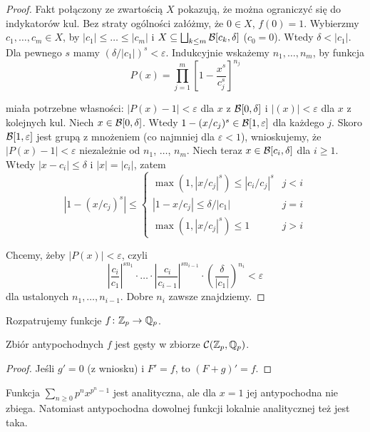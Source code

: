 \begin{proof}
	Fakt połączony ze zwartością $X$ pokazują, że można ograniczyć się do indykatorów kul.
	Bez straty ogólności załóżmy, że $0 \in X$, $f(0) = 1$.
	Wybierzmy $c_1, \ldots, c_m \in X$, by $|c_1| \le \ldots \le |c_m|$ i $X \subseteq \bigsqcup_{k \le m} \mathcal B[c_k, \delta]$ ($c_0 = 0$).
	Wtedy $\delta <|c_1|$.
	Dla pewnego $s$ mamy $(\delta / |c_1|)^s < \varepsilon$.
	Indukcyjnie wskażemy $n_1, \ldots, n_m$, by funkcja
	\[
		P(x) = \prod_{j=1}^m \left[1 - \frac{x^s}{c_j^s}\right]^{n_j}
	\]

	miała potrzebne własności: $|P(x) - 1| < \varepsilon$ dla $x$ z $\mathcal B[0, \delta]$ i $|(x)| < \varepsilon$ dla $x$ z kolejnych kul.
	Niech $x \in \mathcal B[0, \delta]$.
	Wtedy $1 - (x/c_j)^s \in \mathcal B[1, \varepsilon]$ dla każdego $j$.
	Skoro $\mathcal B[1, \varepsilon]$ jest grupą z mnożeniem (co najmniej dla $\varepsilon < 1$), wnioskujemy, że $|P(x) - 1| < \varepsilon$ niezależnie od $n_1$, $\ldots$, $n_m$.
	Niech teraz $x \in \mathcal B[c_i, \delta]$ dla $i \ge 1$.
	Wtedy $|x - c_i| \le \delta$ i $|x| = |c_i|$, zatem
	\[
		|1 - (x/c_j)^s| \le \begin{cases} \max(1, |x/c_j|^s) \le |c_i / c_j|^s & j < i \\
		|1 - x/c_j| \le \delta / |c_1| & j = i \\
		\max(1, |x / c_j|^s) \le 1 & j > i\end{cases}
	\]

	Chcemy, żeby $|P(x)| < \varepsilon$, czyli
	\[
		\left|\frac{c_i}{c_1}\right|^{sn_1} \cdot \ldots \cdot \left|\frac{c_i}{c_{i-1}}\right|^{sn_{i-1}} \cdot \left(\frac{\delta}{|c_1|}\right)^{n_i} < \varepsilon
	\]
	dla ustalonych $n_1, \ldots, n_{i-1}$.
	Dobre $n_i$ zawsze znajdziemy.
\end{proof}

Rozpatrujemy funkcje $f \colon \mathbb Z_p \to \mathbb Q_p$.

\begin{fakt}
	Zbiór  antypochodnych $f$ jest gęsty w zbiorze $\mathcal C(\mathbb Z_p, \mathbb Q_p)$.
\end{fakt}

\begin{proof}
	Jeśli $g' = 0$ (z wniosku) i $F' = f$, to $(F + g)' = f$.
\end{proof}

Funkcja $\sum_{n \ge 0} p^n x^{p^n- 1}$ jest analityczna, ale dla $x = 1$ jej antypochodna nie zbiega.
Natomiast antypochodna dowolnej funkcji lokalnie analitycznej też jest taka.

